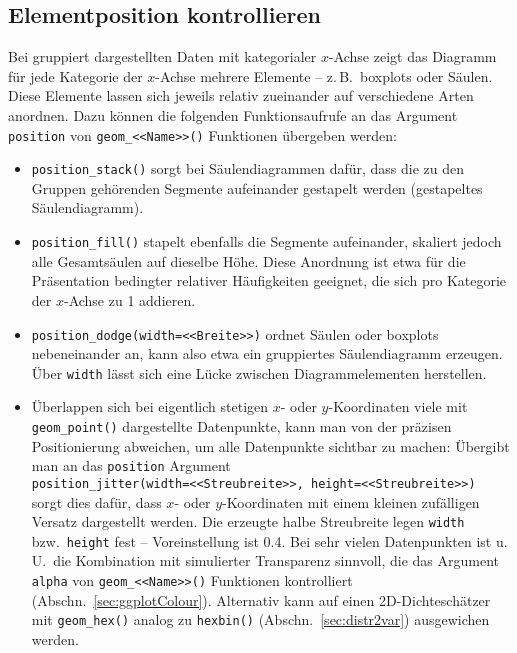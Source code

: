 \subsection{Elementposition kontrollieren}
\label{sec:ggplotPos}

Bei gruppiert dargestellten Daten mit kategorialer $x$-Achse zeigt das Diagramm für jede Kategorie der $x$-Achse mehrere Elemente -- z.\,B.\ boxplots oder Säulen. Diese Elemente lassen sich jeweils relativ zueinander auf verschiedene Arten anordnen. Dazu können die folgenden Funktionsaufrufe an das Argument \lstinline!position! von \lstinline!geom_<<Name>>()! Funktionen übergeben werden:
\begin{itemize}
\item {} \lstinline!position_stack()! sorgt bei Säulendiagrammen dafür, dass die zu den Gruppen gehörenden Segmente aufeinander gestapelt werden (gestapeltes Säulendiagramm).
\item {} \lstinline!position_fill()! stapelt ebenfalls die Segmente aufeinander, skaliert jedoch alle Gesamtsäulen auf dieselbe Höhe. Diese Anordnung ist etwa für die Präsentation bedingter relativer Häufigkeiten geeignet, die sich pro Kategorie der $x$-Achse zu 1 addieren.
\item {} \lstinline!position_dodge(width=<<Breite>>)! ordnet Säulen oder boxplots nebeneinander an, kann also etwa ein gruppiertes Säulendiagramm erzeugen. Über \lstinline!width! lässt sich eine Lücke zwischen Diagrammelementen herstellen.
\item Überlappen sich bei eigentlich stetigen $x$- oder $y$-Koordinaten viele mit \lstinline!geom_point()! dargestellte Datenpunkte, kann man von der präzisen Positionierung abweichen, um alle Datenpunkte sichtbar zu machen: Übergibt man an das \lstinline!position! Argument \\
\lstinline!position_jitter(width=<<Streubreite>>, height=<<Streubreite>>)!\\
sorgt dies dafür, dass $x$- oder $y$-Koordinaten mit einem kleinen zufälligen Versatz dargestellt werden. Die erzeugte halbe Streubreite legen \lstinline!width! bzw.\ \lstinline!height! fest -- Voreinstellung ist 0.4. Bei sehr vielen Datenpunkten ist u.\,U.\ die Kombination mit simulierter Transparenz sinnvoll, die das Argument \lstinline!alpha! von \lstinline!geom_<<Name>>()! Funktionen kontrolliert (Abschn.\ \ref{sec:ggplotColour}). Alternativ kann auf einen 2D-Dichteschätzer mit \lstinline!geom_hex()! analog zu \lstinline!hexbin()! (Abschn.\ \ref{sec:distr2var}) ausgewichen werden.
\end{itemize}

